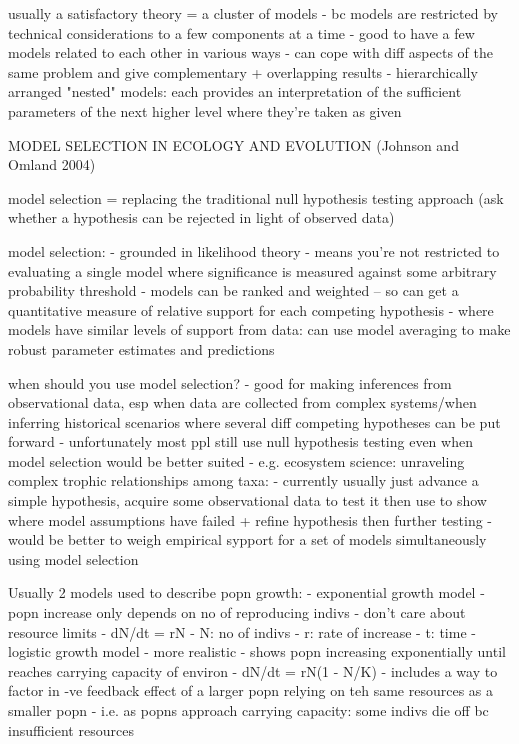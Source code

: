 \documentclass[11pt]{article}
\begin{document}
	usually a satisfactory theory = a cluster of models
	- bc models are restricted by technical considerations to a few components at a time
	- good to have a few models related to each other in various ways 
	- can cope with diff aspects of the same problem and give complementary + overlapping results
	- hierarchically arranged "nested" models: each provides an interpretation of the sufficient parameters of the next higher level where they're taken as given
	
	
	
	MODEL SELECTION IN ECOLOGY AND EVOLUTION (Johnson and Omland 2004)
	
	model selection = replacing the traditional null hypothesis testing approach (ask whether a hypothesis can be rejected in light of observed data)
	
	model selection:
	- grounded in likelihood theory
	- means you're not restricted to evaluating a single model where significance is measured against some arbitrary probability threshold
	- models can be ranked and weighted -- so can get a quantitative measure of relative support for each competing hypothesis
	- where models have similar levels of support from data: can use model averaging to make robust parameter estimates and predictions
	
	when should you use model selection?
	- good for making inferences from observational data, esp when data are collected from complex systems/when inferring historical scenarios where several diff competing hypotheses can be put forward
	- unfortunately most ppl still use null hypothesis testing even when model selection would be better suited
	- e.g. ecosystem science: unraveling complex trophic relationships among taxa:
	- currently usually just advance a simple hypothesis, acquire some observational data to test it then use to show where model assumptions have failed + refine hypothesis then further testing
	- would be better to weigh empirical sypport for a set of models simultaneously using model selection
	
	
	Usually 2 models used to describe popn growth:
	- exponential growth model
	- popn increase only depends on no of reproducing indivs 
	- don't care about resource limits
	- dN/dt = rN
	- N: no of indivs
	- r: rate of increase
	- t: time
	- logistic growth model
	- more realistic
	- shows popn increasing exponentially until reaches carrying capacity of environ
	- dN/dt = rN(1 - N/K)
	- includes a way to factor in -ve feedback effect of a larger popn relying on teh same resources as a smaller popn     - i.e. as popns approach carrying capacity: some indivs       die off bc insufficient resources
	
\end{document}
